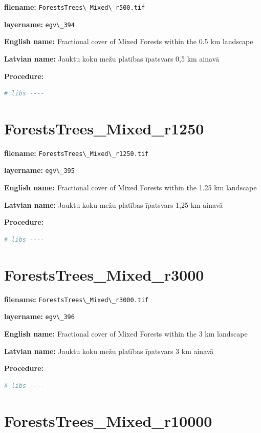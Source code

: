 \documentclass[
]{book}
\newcommand{\passthrough}[1]{#1}
\begin{document}
\textbf{filename:} \passthrough{\lstinline!ForestsTrees\_Mixed\_r500.tif!}

\textbf{layername:} \passthrough{\lstinline!egv\_394!}

\textbf{English name:} Fractional cover of Mixed Forests within the 0.5 km landscape

\textbf{Latvian name:} Jauktu koku mežu platības īpatsvars 0,5 km ainavā

\textbf{Procedure:}

\begin{lstlisting}[language=R]
# libs ----
\end{lstlisting}

\section{ForestsTrees\_Mixed\_r1250}\label{ch06.395}

\textbf{filename:} \passthrough{\lstinline!ForestsTrees\_Mixed\_r1250.tif!}

\textbf{layername:} \passthrough{\lstinline!egv\_395!}

\textbf{English name:} Fractional cover of Mixed Forests within the 1.25 km landscape

\textbf{Latvian name:} Jauktu koku mežu platības īpatsvars 1,25 km ainavā

\textbf{Procedure:}

\begin{lstlisting}[language=R]
# libs ----
\end{lstlisting}

\section{ForestsTrees\_Mixed\_r3000}\label{ch06.396}

\textbf{filename:} \passthrough{\lstinline!ForestsTrees\_Mixed\_r3000.tif!}

\textbf{layername:} \passthrough{\lstinline!egv\_396!}

\textbf{English name:} Fractional cover of Mixed Forests within the 3 km landscape

\textbf{Latvian name:} Jauktu koku mežu platības īpatsvars 3 km ainavā

\textbf{Procedure:}

\begin{lstlisting}[language=R]
# libs ----
\end{lstlisting}

\section{ForestsTrees\_Mixed\_r10000}\label{ch06.397}
\end{document}
